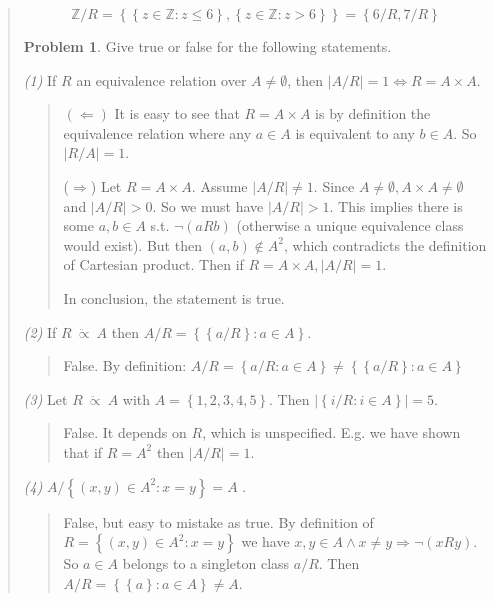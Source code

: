 \documentclass[a4paper, 12pt]{article}
\theoremstyle{definition}
\newtheorem{problem}{Problem}
\theoremstyle{definition}
\theoremstyle{definition}
\begin{document}
\begin{quote}
$$\mathbb{Z} / R = \left\{ \left\{ z \in \mathbb{Z} : z \leq 6 \right\}, \left\{
z \in \mathbb{Z} : z > 6\right\}   \right\}  = \left\{ 6 / R, 7 / R \right\} $$

\begin{problem}
    Give true or false for the following statements.
\end{problem}

\textit{(1)} If $R$ an equivalence relation over $A \neq \emptyset$, then $|A /
R| = 1 \iff R = A \times A$.

\begin{quote}
    $(\Leftarrow)$ It is easy to see that $R = A \times A$ is by definition the
    equivalence relation where any $a \in A$ is equivalent to any $b \in A$. So
    $|R / A| = 1 $.

    ($\Rightarrow$) Let  $R = A\times A$. Assume $|A / R| \neq 1$. Since $A \neq
    \emptyset, A \times A \neq \emptyset$ and $|A / R| > 0$. So we must have $|
    A / R| > 1$. This implies there is some $a,b \in A$ s.t. $\neg(aRb)$
    (otherwise a unique equivalence class would exist). But then
    $(a, b) \not\in A^2$, which contradicts the definition of Cartesian product.
    Then if $R = A \times A, |A / R| = 1$.

    In conclusion, the statement is true.
\end{quote}

\textit{(2)} If $R ~ \ddot{\propto} ~ A$ then $A / R = \left\{ \left\{ a / R
\right\} : a \in A  \right\} $. 

\begin{quote}
    False. By definition: $A / R = \left\{ a / R : a \in A \right\} \neq \left\{
    \left\{ a / R  \right\} : a \in A\right\} $
\end{quote}

\textit{(3)} Let $R ~ \ddot{\propto} ~ A$ with $A = \left\{ 1, 2,3,4,5 \right\}
$. Then $ | \left\{ i / R : i \in A \right\}  | = 5$.

\begin{quote}
    False. It depends on $R$, which is unspecified. E.g. we have shown that if
    $R = A^2$ then $ | A / R | = 1 $.
\end{quote}

\textit{(4)} $A / \left\{ (x, y) \in A^2 : x = y \right\} = A$ .

\begin{quote}
    False, but easy to mistake as true. By definition of $R = \left\{ (x, y)
    \in A^2 : x = y \right\} $ we have $x, y \in A \land x\neq y \Rightarrow
    \neg(xRy)$. So $a \in A$ belongs to a singleton class $a / R$. Then $A / R
    = \left\{ \left\{ a \right\} : a \in A\right\}  \neq A$.
\end{quote}


\end{quote}
\end{document}
